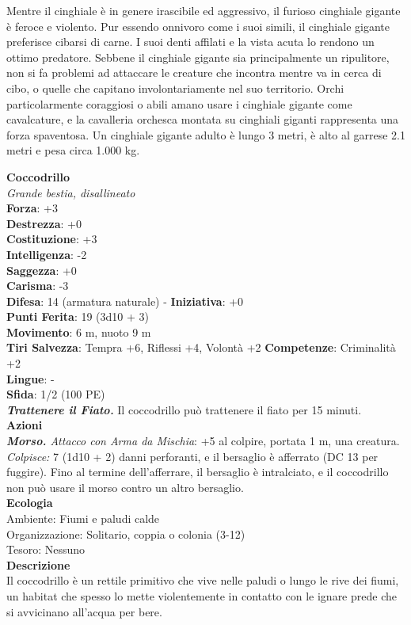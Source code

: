 \begin{multicols}{2}
Mentre il cinghiale è in genere irascibile ed aggressivo, il furioso cinghiale gigante è feroce e violento. Pur essendo onnivoro come i suoi simili, il cinghiale gigante preferisce cibarsi di carne. I suoi denti affilati e la vista acuta lo rendono un ottimo predatore. Sebbene il cinghiale gigante sia principalmente un ripulitore, non si fa problemi ad attaccare le creature che incontra mentre va in cerca di cibo, o quelle che capitano involontariamente nel suo territorio. Orchi particolarmente coraggiosi o abili amano usare i cinghiale gigante come cavalcature, e la cavalleria orchesca montata su cinghiali giganti rappresenta una forza spaventosa. Un cinghiale gigante adulto è lungo 3 metri, è alto al garrese 2.1 metri e pesa circa 1.000 kg.


\medskip\textbf{Coccodrillo}\\
\emph{Grande bestia, disallineato}\\
\textbf{Forza}: +3\\
\textbf{Destrezza}: +0\\
\textbf{Costituzione}: +3\\
\textbf{Intelligenza}: -2\\
\textbf{Saggezza}: +0\\
\textbf{Carisma}: -3\\
\textbf{Difesa}: 14 (armatura naturale) - \textbf{Iniziativa}: +0\\
\textbf{Punti Ferita}: 19 (3d10 + 3)\\
\textbf{Movimento}: 6 m, nuoto 9 m\\
\textbf{Tiri Salvezza}: Tempra +6, Riflessi +4, Volontà +2 
\textbf{Competenze}: Criminalità +2\\
\textbf{Lingue}: -\\
\textbf{Sfida}: 1/2 (100 PE)\smallskip\\
\emph{\textbf{Trattenere il Fiato.}} Il coccodrillo può trattenere il fiato per 15 minuti.\\
\smallskip\textbf{Azioni}\\
\emph{\textbf{Morso.} Attacco con Arma da Mischia}: +5 al colpire, portata 1 m, una creatura.\\
\emph{Colpisce:} 7 (1d10 + 2) danni perforanti, e il bersaglio è afferrato (DC  13 per fuggire). Fino al termine dell'afferrare, il bersaglio è intralciato, e il coccodrillo non può usare il morso contro un altro bersaglio.\\
\textbf{Ecologia}\\
Ambiente: Fiumi e paludi calde\\
Organizzazione: Solitario, coppia o colonia (3-12)\\
Tesoro: Nessuno\\
\textbf{Descrizione}\\
Il coccodrillo è un rettile primitivo che vive nelle paludi o lungo le rive dei fiumi, un habitat che spesso lo mette violentemente in contatto con le ignare prede che si avvicinano all'acqua per bere.\\


\end{multicols}
